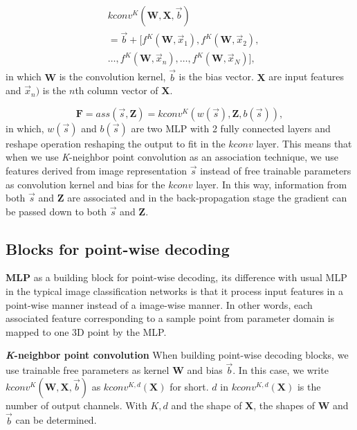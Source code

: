 \begin{equation}
\begin{aligned}
&kconv^{K}(\mathbf{W},\mathbf{X},\vec{b})\\
&=\vec{b}+[f^{K}(\mathbf{W},\vec{x}_1),f^{K}(\mathbf{W},\vec{x}_2),\\
&\dots,f^{K}(\mathbf{W},\vec{x}_n),\dots,f^{K}(\mathbf{W},\vec{x}_N)],
\end{aligned}
\end{equation}
in which $\mathbf{W}$ is the convolution kernel, $\vec{b}$ is the bias vector. $\mathbf{X}$ are input features and $\vec{x}_n)$ is the $n$th column vector of $\mathbf{X}$. 


\begin{equation}
\mathbf{F}=ass(\vec{s},\mathbf{Z})=kconv^{K}(w(\vec{s}),\mathbf{Z},b(\vec{s})),
\end{equation}
in which, $w(\vec{s})$ and $b(\vec{s})$ are two MLP with 2 fully connected layers and reshape operation reshaping the output to fit in the $kconv$ layer. This means that when we use \emph{K}-neighbor point convolution as an association technique, we use features derived from image representation $\vec{s}$  instead of free trainable parameters as convolution kernel and bias for the $kconv$ layer. In this way, information from both $\vec{s}$ and $\mathbf{Z}$ are associated and in the back-propagation stage the gradient can be passed down to both $\vec{s}$ and $\mathbf{Z}$.
\subsection{Blocks for point-wise decoding}

\noindent\textbf{MLP} as a building block for point-wise decoding, its difference with usual MLP in the typical image classification networks is that it process input features in a point-wise manner instead of a image-wise manner. In other words, each associated feature corresponding to a sample point from parameter domain is mapped to one 3D point by the MLP.

\noindent\textbf{\emph{K}-neighbor point convolution}
When building point-wise decoding blocks, we use trainable free parameters as kernel $\mathbf{W}$ and bias $\vec{b}$. In this case, we write $kconv^{K}(\mathbf{W},\mathbf{X},\vec{b})$ as $kconv^{K,d}(\mathbf{X})$ for short. $d$ in $kconv^{K,d}(\mathbf{X})$ is the number of output channels. With $K,d$ and the shape of $\mathbf{X}$, the shapes of $\mathbf{W}$ and $\vec{b}$ can be determined.

